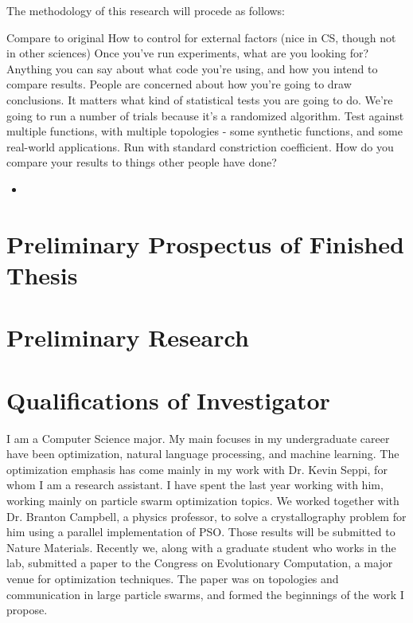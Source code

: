 \documentclass[onecolumn, 12pt]{article}
\begin{document}
The methodology of this research will procede as follows:

Compare to original How to control for external factors (nice in CS, though not
in other sciences) Once you've run experiments, what are you looking for?
Anything you can say about what code you're using, and how you intend to
compare results.  People are concerned about how you're going to draw
conclusions.  It matters what kind of statistical tests you are going to do.
We're going to run a number of trials because it's a randomized algorithm.
Test against multiple functions, with multiple topologies - some synthetic
functions, and some real-world applications.  Run with standard constriction
coefficient.  How do you compare your results to things other people have done?


\begin{itemize}

\item

\end{itemize}

\section{Preliminary Prospectus of Finished Thesis}

\section{Preliminary Research}

\section{Qualifications of Investigator}

I am a Computer Science major.  My main focuses in my undergraduate career have
been optimization, natural language processing, and machine learning.  The
optimization emphasis has come mainly in my work with Dr. Kevin Seppi, for whom
I am a research assistant.  I have spent the last year working with him,
working mainly on particle swarm optimization topics.  We worked together with
Dr. Branton Campbell, a physics professor, to solve a crystallography problem
for him using a parallel implementation of PSO.  Those results will be
submitted to Nature Materials.  Recently we, along with a graduate student who
works in the lab, submitted a paper to the Congress on Evolutionary
Computation, a major venue for optimization techniques.  The paper was on
topologies and communication in large particle swarms, and formed the
beginnings of the work I propose.
\end{document}
